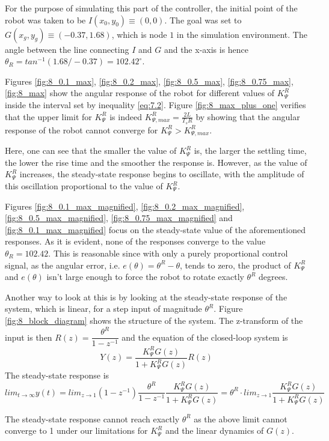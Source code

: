 For the purpose of simulating this part of the controller, the initial point of
the robot was taken to be $I (x_0, y_0) \equiv (0,0)$. The goal was set to
$G (x_g, y_g) \equiv (-0.37, 1.68)$, which is node $1$ in the simulation
environment. The angle between the line connecting $I$ and $G$ and the
x-axis is hence $\theta_R = tan^{-1}(1.68 / -0.37) = 102.42^{\circ}$.

Figures \ref{fig:8_0.1_max}, \ref{fig:8_0.2_max}, \ref{fig:8_0.5_max},
\ref{fig:8_0.75_max}, \ref{fig:8_max} show the angular response of the robot
for different values of $K_{\Psi}^R$ inside the interval set by inequality
\ref{eq:7.2}. Figure \ref{fig:8_max_plus_one} verifies that the upper limit
for $K_{\Psi}^R$ is indeed $K_{\Psi,max}^R = \frac{2L}{T_s R}$ by showing that the
angular response of the robot cannot converge for $K_{\Psi}^R > K_{\Psi,max}^R$.

Here, one can see that the smaller the value of $K_{\Psi}^R$ is, the larger the
settling time, the lower the rise time and the smoother the response is. However,
as the value of $K_{\Psi}^R$ increases, the steady-state response begins to
oscillate, with the amplitude of this oscillation proportional to the value of
$K_{\Psi}^R$.

Figures \ref{fig:8_0.1_max_magnified}, \ref{fig:8_0.2_max_magnified},
\ref{fig:8_0.5_max_magnified}, \ref{fig:8_0.75_max_magnified} and
\ref{fig:8_0.1_max_magnified} focus on the steady-state value of the
aforementioned responses. As it is evident, none of the responses converge to
the value $\theta_R = 102.42$. This is reasonable since with only a purely
proportional control signal, as the angular error, i.e. $e(\theta) = \theta^R - \theta$,
tends to zero, the product of $K_{\Psi}^R$ and $e(\theta)$ isn't large enough
to force the robot to rotate exactly $\theta^R$ degrees.

Another way to look at this is by looking at the steady-state response of the
system, which is linear, for a step input of magnitude $\theta^R$. Figure
\ref{fig:8_block_diagram} shows the structure of the system. The z-transform of
the input is then $R(z) = \dfrac{\theta^R}{1 - z^{-1}}$ and the equation of the
closed-loop system is
$$Y(z) = \dfrac{K_{\Psi}^R G(z)}{1 + K_{\Psi}^R G(z)} R(z)$$
The steady-state response is
$$lim_{t \to \infty} y(t) = lim_{z \to 1} (1-z^{-1}) \dfrac{\theta^R}{1-z^{-1}}
\dfrac{K_{\Psi}^R G(z)}{1 + K_{\Psi}^R G(z)} = \theta^R \cdot lim_{z \to 1}
\dfrac{K_{\Psi}^R G(z)}{1 + K_{\Psi}^R G(z)}$$

The steady-state response cannot reach exactly $\theta^R$ as the above limit
cannot converge to 1 under our limitations for $K_{\Psi}^R$ and the
linear dynamics of $G(z)$.

